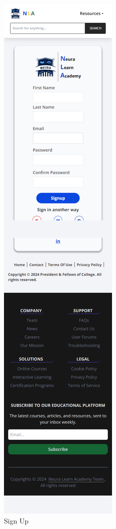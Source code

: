 \begin{figure}[h!]
	\centering
	\includegraphics[max height=\textheight,max width=\textwidth]{figures/frontend/sign up mobile.png}
	\caption{Sign Up}
\end{figure}

